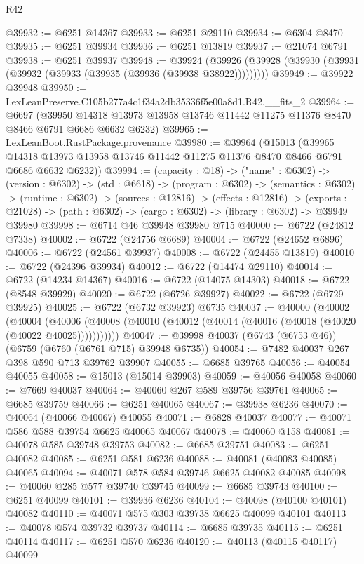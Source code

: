 \begin{lexlean}{R42}
\begin{coremodule}
{@39932 := @6251 @14367
@39933 := @6251 @29110
@39934 := @6304 @8470
@39935 := @6251 @39934
@39936 := @6251 @13819
@39937 := @21074 @6791
@39938 := @6251 @39937
@39948 := @39924
    (@39926 (@39928 (@39930 (@39931 (@39932 (@39933 (@39935 (@39936 (@39938 @38922)))))))))
@39949 := @39922 @39948
@39950 := LexLeanPreserve.C105b277a4c1f34a2db35336f5e00a8d1.R42.__fits_2
@39964 := @6697
    (@39950 @14318 @13973 @13958 @13746 @11442 @11275 @11376 @8470 @8466 @6791 @6686 @6632 @6232)
@39965 := LexLeanBoot.RustPackage.provenance
@39980 := @39964
    (@15013
      (@39965 @14318 @13973 @13958 @13746 @11442 @11275 @11376 @8470 @8466 @6791 @6686 @6632 @6232))
@39994 := (capacity : @18) ->
  ("name" : @6302) ->
  (version : @6302) ->
  (std : @6618) ->
  (program : @6302) ->
  (semantics : @6302) ->
  (runtime : @6302) ->
  (sources : @12816) ->
  (effects : @12816) ->
  (exports : @21028) -> (path : @6302) -> (cargo : @6302) -> (library : @6302) -> @39949 @39980
@39998 := @6714 @46 @39948 @39980 @715
@40000 := @6722 (@24812 @7338)
@40002 := @6722 (@24756 @6689)
@40004 := @6722 (@24652 @6896)
@40006 := @6722 (@24561 @39937)
@40008 := @6722 (@24455 @13819)
@40010 := @6722 (@24396 @39934)
@40012 := @6722 (@14474 @29110)
@40014 := @6722 (@14234 @14367)
@40016 := @6722 (@14075 @14303)
@40018 := @6722 (@8548 @39929)
@40020 := @6722 (@6726 @39927)
@40022 := @6722 (@6729 @39925)
@40025 := @6722 (@6732 @39923) @6735
@40037 := @40000
    (@40002
      (@40004
        (@40006 (@40008 (@40010 (@40012 (@40014 (@40016 (@40018 (@40020 (@40022 @40025)))))))))))
@40047 := @39998 @40037 (@6743 (@6753 @46)) (@6759 (@6760 (@6761 @715) @39948 @6735))
@40054 := @7482 @40037 @267 @398 @590 @713 @39762 @39907
@40055 := @6685 @39765
@40056 := @40054 @40055
@40058 := @15013 (@15014 @39903)
@40059 := @40056 @40058
@40060 := @7669 @40037
@40064 := @40060 @267 @589 @39756 @39761
@40065 := @6685 @39759
@40066 := @6251 @40065
@40067 := @39938 @6236
@40070 := @40064 (@40066 @40067) @40055
@40071 := @6828 @40037
@40077 := @40071 @586 @588 @39754 @6625 @40065 @40067
@40078 := @40060 @158
@40081 := @40078 @585 @39748 @39753
@40082 := @6685 @39751
@40083 := @6251 @40082
@40085 := @6251 @581 @6236
@40088 := @40081 (@40083 @40085) @40065
@40094 := @40071 @578 @584 @39746 @6625 @40082 @40085
@40098 := @40060 @285 @577 @39740 @39745
@40099 := @6685 @39743
@40100 := @6251 @40099
@40101 := @39936 @6236
@40104 := @40098 (@40100 @40101) @40082
@40110 := @40071 @575 @303 @39738 @6625 @40099 @40101
@40113 := @40078 @574 @39732 @39737
@40114 := @6685 @39735
@40115 := @6251 @40114
@40117 := @6251 @570 @6236
@40120 := @40113 (@40115 @40117) @40099
}
\end{coremodule}
\end{lexlean}
